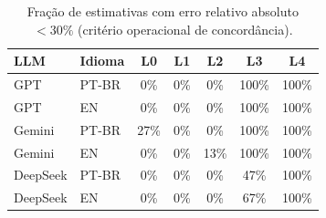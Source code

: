 \begin{table}[h]
\centering
\caption{Fração de estimativas com erro relativo absoluto $<30\%$ (critério operacional de concordância).}
\label{tab:agreement}
\begin{tabular}{llccccc}
\toprule
\textbf{LLM} & \textbf{Idioma} & \textbf{L0} & \textbf{L1} & \textbf{L2} & \textbf{L3} & \textbf{L4} \\
\midrule
GPT & PT-BR & 0\% & 0\% & 0\% & 100\% & 100\% \\
GPT & EN & 0\% & 0\% & 0\% & 100\% & 100\% \\
Gemini & PT-BR & 27\% & 0\% & 0\% & 100\% & 100\% \\
Gemini & EN & 0\% & 0\% & 13\% & 100\% & 100\% \\
DeepSeek & PT-BR & 0\% & 0\% & 0\% & 47\% & 100\% \\
DeepSeek & EN & 0\% & 0\% & 0\% & 67\% & 100\% \\
\bottomrule
\end{tabular}
\end{table}